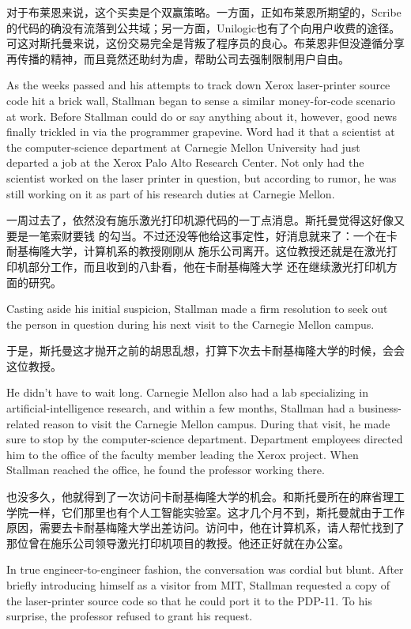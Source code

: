 \ifdefined\chs
对于布莱恩来说，这个买卖是个双赢策略。一方面，正如布莱恩所期望的，Scribe的代码的确没有流落到公共域；另一方面，Unilogic也有了个向用户收费的途径。可这对斯托曼来说，这份交易完全是背叛了程序员的良心。布莱恩非但没遵循分享再传播的精神，而且竟然还助纣为虐，帮助公司去强制限制用户自由。
\fi

\ifdefined\eng
As the weeks passed and his attempts to track down Xerox laser-printer source code hit a brick wall, Stallman began to sense a similar money-for-code scenario at work. Before Stallman could do or say anything about it, however, good news finally trickled in via the programmer grapevine. Word had it that a scientist at the computer-science department at Carnegie Mellon University had just departed a job at the Xerox Palo Alto Research Center. Not only had the scientist worked on the laser printer in question, but according to rumor, he was still working on it as part of his research duties at Carnegie Mellon.
\fi

\ifdefined\chs
一周过去了，依然没有施乐激光打印机源代码的一丁点消息。斯托曼觉得这好像又要是一笔索财要钱
的勾当。不过还没等他给这事定性，好消息就来了：一个在卡耐基梅隆大学，计算机系的教授刚刚从
施乐公司离开。这位教授还就是在激光打印机部分工作，而且收到的八卦看，他在卡耐基梅隆大学
还在继续激光打印机方面的研究。
\fi

\ifdefined\eng
Casting aside his initial suspicion, Stallman made a firm resolution to seek out the person in question during his next visit to the Carnegie Mellon campus.
\fi

\ifdefined\chs
于是，斯托曼这才抛开之前的胡思乱想，打算下次去卡耐基梅隆大学的时候，会会这位教授。
\fi

\ifdefined\eng
He didn't have to wait long. Carnegie Mellon also had a lab specializing in artificial-intelligence research, and within a few months, Stallman had a business-related reason to visit the Carnegie Mellon campus. During that visit, he made sure to stop by the computer-science department. Department employees directed him to the office of the faculty member leading the Xerox project. When Stallman reached the office, he found the professor working there.
\fi

\ifdefined\chs
也没多久，他就得到了一次访问卡耐基梅隆大学的机会。和斯托曼所在的麻省理工学院一样，它们那里也有个人工智能实验室。这才几个月不到，斯托曼就由于工作原因，需要去卡耐基梅隆大学出差访问。访问中，他在计算机系，请人帮忙找到了那位曾在施乐公司领导激光打印机项目的教授。他还正好就在办公室。
\fi


\ifdefined\eng
In true engineer-to-engineer fashion, the conversation was cordial but blunt. After briefly introducing himself as a visitor from MIT, Stallman requested a copy of the laser-printer source code so that he could port it to the PDP-11. To his surprise, the professor refused to grant his request.
\fi

